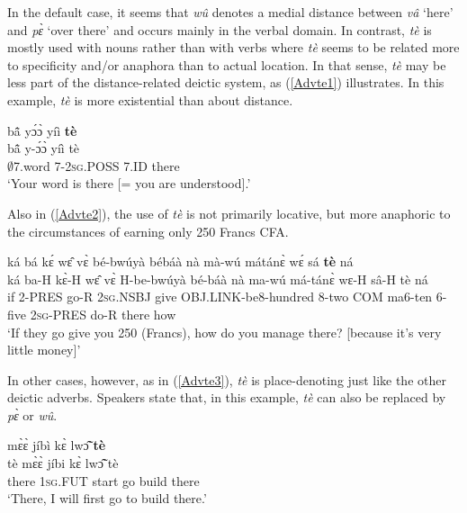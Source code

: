In the default case, it seems that {\itshape wû} denotes a medial distance between {\itshape vâ} `here' and {\itshape pɛ̀} `over there' and occurs mainly in the verbal domain. In contrast, {\itshape tè} is mostly used with nouns rather than with verbs where {\itshape tè} seems to be related more to specificity and/or anaphora than to actual location. In that sense, {\itshape tè} may be less part of the distance-related deictic system, as (\ref{Advte1}) illustrates. In this example, {\itshape tè} is more existential than about distance.


\begin{exe} 
\ex\label{Advte1}
  \glll     bã̂ yɔ́ɔ̀ yíì {\bfseries tè} \\
	bã̂ y-ɔ́ɔ̀ yíì tè \\
              $\emptyset$7.word 7-2\textsc{sg}.POSS  7.ID there  \\
    \trans `Your word is there [= you are understood].'
\end{exe}

\noindent Also in (\ref{Advte2}), the use of {\itshape tè} is not primarily locative, but more anaphoric to the circumstances of earning only 250 Francs CFA.

\begin{exe} 
\ex\label{Advte2}
  \glll ká bá kɛ́ wɛ̂ vɛ̀ bé-bwúyà  bébáà nà mà-wú mátánɛ̀ wɛ́ sá {\bfseries tè} ná  \\
        ká ba-H kɛ̀-H wɛ̂ vɛ̀ H-be-bwúyà  bé-báà nà ma-wú má-tánɛ̀ wɛ-H sâ-H tè ná  \\
        if 2-PRES go-R 2\textsc{sg}.NSBJ give OBJ.LINK-be8-hundred 8-two COM ma6-ten 6-five 2\textsc{sg}-PRES do-R there how  \\
    \trans `If they go give you 250 (Francs), how do you manage there? [because it's very little money]'
\end{exe}

In other cases, however, as in (\ref{Advte3}), {\itshape tè} is place-denoting just like the other deictic adverbs. Speakers state that, in this example, {\itshape tè} can also be replaced by {\itshape pɛ̀} or {\itshape wû}. 

\begin{exe} 
\ex\label{Advte3}
   mɛ̀ɛ̀ jíbì kɛ̀ lwɔ̃̂ {\bfseries tè} \\
	tè mɛ̀ɛ̀ jíbi kɛ̀ lwɔ̃̂ tè \\
             there 1\textsc{sg}.FUT start go build there  \\
    \trans `There, I will first go to build there.'
\end{exe}

